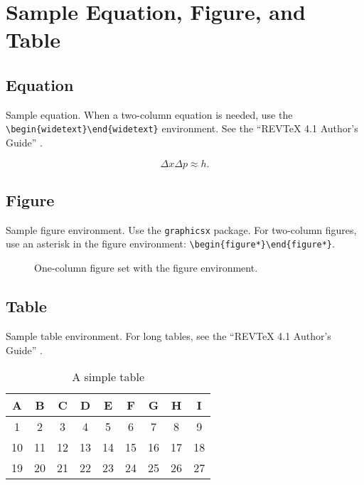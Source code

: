 \documentclass[osajnl,twocolumn,showpacs,superscriptaddress,10pt]{revtex4-1} %
\begin{document}
\section{Sample Equation, Figure, and Table}

\subsection{Equation}
Sample equation. When a two-column equation is needed, use the \verb+\begin{widetext}\end{widetext}+ environment. See the ``REVTeX 4.1 Author's Guide'' \cite{revtex-au}.

\begin{equation}
 \Delta x \Delta p \approx h.
\end{equation}



\subsection{Figure}
Sample figure environment. Use the \verb+graphicsx+ package. For two-column figures, use an asterisk in the figure environment: \verb+\begin{figure*}\end{figure*}+.


\begin{figure}[htbp]
\caption{One-column figure set with the figure environment.}
\end{figure}





\subsection{Table}
Sample table environment. For long tables, see the ``REVTeX 4.1 Author's Guide'' \cite{revtex-au}.

\begin{table}[h!]
  \caption{A simple table}
  \begin{center}
    \begin{tabular}{ccccccccc}
    \hline
    A & B & C & D & E & F & G & H & I\\
    \hline
    1 & 2 & 3 & 4 & 5 & 6 & 7 & 8 & 9\\
    10 & 11 & 12 & 13 & 14 & 15 & 16 & 17 & 18\\
    19 & 20 & 21 & 22 & 23 & 24 & 25 & 26 & 27\\
    \hline
    \end{tabular}
  \end{center}
\end{table}
\end{document}
